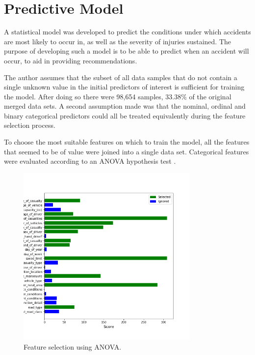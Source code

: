\documentclass[12pt]{article}
\begin{document}
\section{Predictive Model}


A statistical model was developed to predict the conditions under which accidents are most likely to occur in, as well as the severity of injuries sustained.
The purpose of developing such a model is to be able to predict when an accident will occur, to aid in providing recommendations.


The author assumes that the subset of all data samples that do not contain a single unknown value in the initial predictors of interest is sufficient for training the model. After doing so there were 98,654 samples, 33.38\% of the original merged data sets. A second assumption made was that the nominal, ordinal and binary categorical predictors could all be treated equivalently during the feature selection process.


To choose the most suitable features on which to train the model, all the features that seemed to be of value were joined into a single data set. Categorical features were evaluated according to an ANOVA hypothesis test \parencite{anova}.

\begin{figure}[h]
\centering     %
\includegraphics[width=0.80\textwidth]{feature_plot}
\caption{Feature selection using ANOVA.}
\label{feature-selection}
\end{figure}
\end{document}

